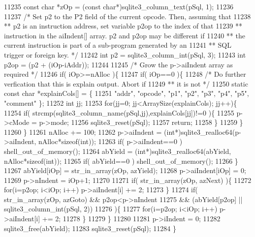 \begin{DoxyCode}
11235     \textcolor{keyword}{const} \textcolor{keywordtype}{char} *zOp = (\textcolor{keyword}{const} \textcolor{keywordtype}{char}*)sqlite3_column_text(pSql, 1);
11236 
11237     \textcolor{comment}{/* Set p2 to the P2 field of the current opcode. Then, assuming that}
11238 \textcolor{comment}{    ** p2 is an instruction address, set variable p2op to the index of that}
11239 \textcolor{comment}{    ** instruction in the aiIndent[] array. p2 and p2op may be different if}
11240 \textcolor{comment}{    ** the current instruction is part of a sub-program generated by an}
11241 \textcolor{comment}{    ** SQL trigger or foreign key.  */}
11242     \textcolor{keywordtype}{int} p2 = sqlite3_column_int(pSql, 3);
11243     \textcolor{keywordtype}{int} p2op = (p2 + (iOp-iAddr));
11244 
11245     \textcolor{comment}{/* Grow the p->aiIndent array as required */}
11246     \textcolor{keywordflow}{if}( iOp>=nAlloc )\{
11247       \textcolor{keywordflow}{if}( iOp==0 )\{
11248         \textcolor{comment}{/* Do further verfication that this is explain output.  Abort if}
11249 \textcolor{comment}{        ** it is not */}
11250         \textcolor{keyword}{static} \textcolor{keyword}{const} \textcolor{keywordtype}{char} *explainCols[] = \{
11251            \textcolor{stringliteral}{"addr"}, \textcolor{stringliteral}{"opcode"}, \textcolor{stringliteral}{"p1"}, \textcolor{stringliteral}{"p2"}, \textcolor{stringliteral}{"p3"}, \textcolor{stringliteral}{"p4"}, \textcolor{stringliteral}{"p5"}, \textcolor{stringliteral}{"comment"} \};
11252         \textcolor{keywordtype}{int} jj;
11253         \textcolor{keywordflow}{for}(jj=0; jj<ArraySize(explainCols); jj++)\{
11254           \textcolor{keywordflow}{if}( strcmp(sqlite3_column_name(pSql,jj),explainCols[jj])!=0 )\{
11255             p->cMode = p->mode;
11256             sqlite3_reset(pSql);
11257             \textcolor{keywordflow}{return};
11258           \}
11259         \}
11260       \}
11261       nAlloc += 100;
11262       p->aiIndent = (\textcolor{keywordtype}{int}*)sqlite3_realloc64(p->aiIndent, nAlloc*\textcolor{keyword}{sizeof}(\textcolor{keywordtype}{int}));
11263       \textcolor{keywordflow}{if}( p->aiIndent==0 ) shell_out_of_memory();
11264       abYield = (\textcolor{keywordtype}{int}*)sqlite3_realloc64(abYield, nAlloc*\textcolor{keyword}{sizeof}(\textcolor{keywordtype}{int}));
11265       \textcolor{keywordflow}{if}( abYield==0 ) shell_out_of_memory();
11266     \}
11267     abYield[iOp] = str_in_array(zOp, azYield);
11268     p->aiIndent[iOp] = 0;
11269     p->nIndent = iOp+1;
11270 
11271     \textcolor{keywordflow}{if}( str_in_array(zOp, azNext) )\{
11272       \textcolor{keywordflow}{for}(i=p2op; i<iOp; i++) p->aiIndent[i] += 2;
11273     \}
11274     \textcolor{keywordflow}{if}( str_in_array(zOp, azGoto) && p2op<p->nIndent
11275      && (abYield[p2op] || sqlite3_column_int(pSql, 2))
11276     )\{
11277       \textcolor{keywordflow}{for}(i=p2op; i<iOp; i++) p->aiIndent[i] += 2;
11278     \}
11279   \}
11280 
11281   p->iIndent = 0;
11282   sqlite3_free(abYield);
11283   sqlite3_reset(pSql);
11284 \}
\end{DoxyCode}
\mbox{\label{shell_8c_a2a428f54866d56810df612c425015fc7}} 
